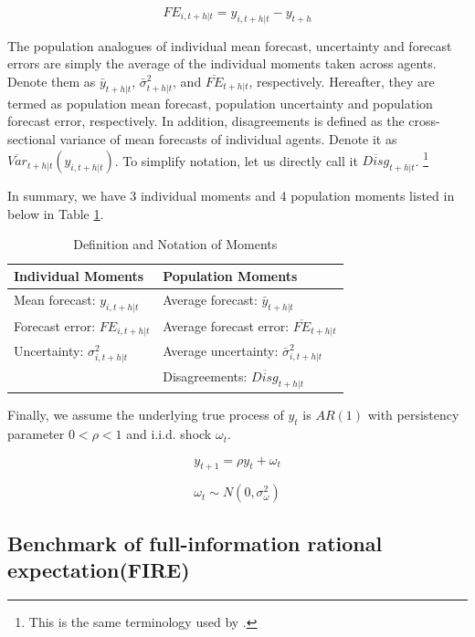 \documentclass[]{article}
\begin{document}
$$FE_{i,t+h|t} = y_{i,t+h|t} - y_{t+h}$$

The population analogues of individual mean forecast, uncertainty and forecast errors are simply the average of the individual moments taken across agents. Denote them as $\bar y_{t+h|t}$, $\bar \sigma^2_{t+h|t}$, and $\overline{FE}_{t+h|t}$, respectively. Hereafter, they are termed as population mean forecast, population uncertainty and population forecast error, respectively. In addition, disagreements is defined as the cross-sectional variance of mean forecasts of individual agents.  Denote it as $\overline{Var}_{t+h|t}(y_{i,t+h|t}) $. To simplify notation, let us directly call it $\overline{Disg}_{t+h|t}$.  \footnote{This is the same terminology used by \cite{xx}.}

In summary, we have 3 individual moments and 4 population moments listed in below in Table \ref{MomSum}.

\begin{table}[]\label{MomSum}
	\centering
		\caption{Definition and Notation of Moments}
	\begin{tabular}{ll}

		\hline 
		Individual Moments                                  & Population Moments                             \\
		\hline 
	Mean forecast: $y_{i,t+h|t}$                   & Average forecast: $\bar y_{t+h|t}$                   \\
		Forecast error: $FE_{i,t+h|t}$ & Average forecast error: $\overline{FE}_{t+h|t}$ \\
		Uncertainty: $\sigma^2_{i,t+h|t}$         & Average uncertainty:  $\bar \sigma^2_{i,t+h|t}$ \\
		& Disagreements:  $\overline{Disg}_{t+h|t}$       \\
		\hline 
	\end{tabular}
\end{table}

Finally, we assume the underlying true process of $y_{t}$ is $AR(1)$ with persistency parameter $0<\rho <1$ and i.i.d. shock $\omega_t$. 

$$y_{t+1} = \rho y_t + \omega_t$$

$$\omega_t \sim N(0,\sigma^2_{\omega})$$

\subsection{Benchmark of full-information rational expectation(FIRE)}
\end{document}
